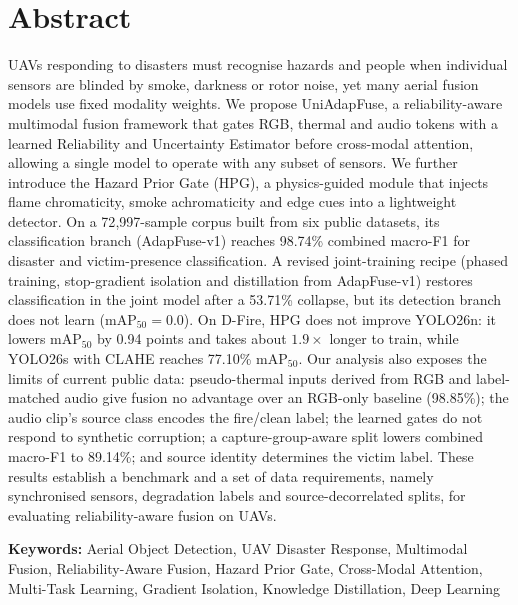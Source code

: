 \section*{Abstract}

UAVs responding to disasters must recognise hazards and people when individual sensors are blinded by smoke, darkness or rotor noise, yet many aerial fusion models use fixed modality weights. We propose UniAdapFuse, a reliability-aware multimodal fusion framework that gates RGB, thermal and audio tokens with a learned Reliability and Uncertainty Estimator before cross-modal attention, allowing a single model to operate with any subset of sensors. We further introduce the Hazard Prior Gate (HPG), a physics-guided module that injects flame chromaticity, smoke achromaticity and edge cues into a lightweight detector. On a 72{,}997-sample corpus built from six public datasets, its classification branch (AdapFuse-v1) reaches 98.74\% combined macro-F1 for disaster and victim-presence classification. A revised joint-training recipe (phased training, stop-gradient isolation and distillation from AdapFuse-v1) restores classification in the joint model after a 53.71\% collapse, but its detection branch does not learn ($\mathrm{mAP}_{50}=0.0$). On D-Fire, HPG does not improve YOLO26n: it lowers $\mathrm{mAP}_{50}$ by 0.94 points and takes about $1.9\times$ longer to train, while YOLO26s with CLAHE reaches 77.10\% $\mathrm{mAP}_{50}$. Our analysis also exposes the limits of current public data: pseudo-thermal inputs derived from RGB and label-matched audio give fusion no advantage over an RGB-only baseline (98.85\%); the audio clip's source class encodes the fire/clean label; the learned gates do not respond to synthetic corruption; a capture-group-aware split lowers combined macro-F1 to 89.14\%; and source identity determines the victim label. These results establish a benchmark and a set of data requirements, namely synchronised sensors, degradation labels and source-decorrelated splits, for evaluating reliability-aware fusion on UAVs.

\vspace{1cm}
\textbf{Keywords:} Aerial Object Detection, UAV Disaster Response, Multimodal Fusion, Reliability-Aware Fusion, Hazard Prior Gate, Cross-Modal Attention, Multi-Task Learning, Gradient Isolation, Knowledge Distillation, Deep Learning
\pagebreak
